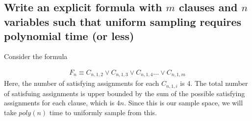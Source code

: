 \documentclass{article}
\begin{document}
\subsection{Write an explicit formula with $m$ clauses and $n$ variables
such that uniform sampling requires polynomial time (or less)}

Consider the formula

\begin{align*}
    F_n \equiv C_{n, 1, 2} \lor C_{n, 1, 3} \lor C_{n, 1, 4} \dots \lor C_{n, 1, m}
\end{align*}
Here, the number of satisfying assignments for each $C_{n, 1, i}$ is 4. The
total number of satisfuing assignments is upper bounded by the sum of the possible
satisfying assignments for each clause, which is $4n$. Since this is our
sample space, we will take $poly(n)$ time to uniformly sample from this.
\end{document}

